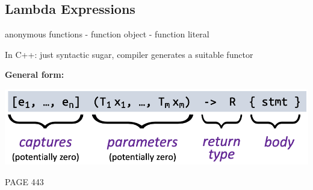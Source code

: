 \begin{sectionbox}
\subsection{Lambda Expressions}\smallskip
anonymous functions - function object - function literal\par
In C++: just syntactic sugar, compiler generates a suitable functor

\textbf{General form:}
\begin{center}
    \includegraphics[width=\columnwidth]{img/Lambda.png}
\end{center}
\end{sectionbox}



PAGE 443